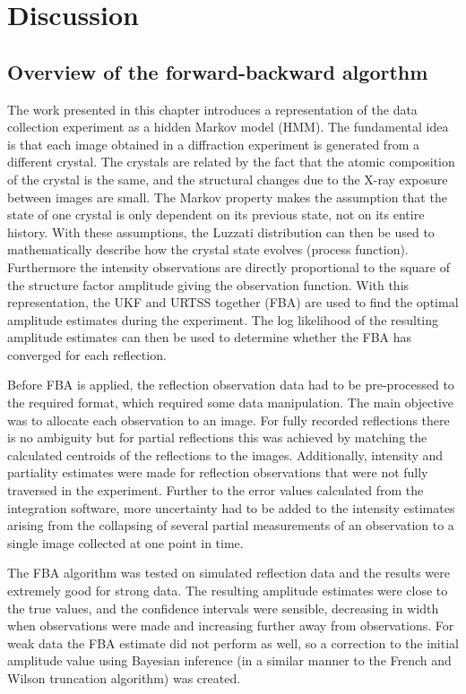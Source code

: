 \section{Discussion}
\label{sec:Discussion - Data Reduction}

\subsection{Overview of the forward-backward algorthm}
\label{sub:Overview of the forward-backward algorthm}
The work presented in this chapter introduces a representation of the data collection experiment as a hidden Markov model (HMM).
The fundamental idea is that each image obtained in a diffraction experiment is generated from a different crystal.
The crystals are related by the fact that the atomic composition of the crystal is the same, and the structural changes due to the X-ray exposure between images are small.
The Markov property makes the assumption that the state of one crystal is only dependent on its previous state, not on its entire history.
With these assumptions, the Luzzati distribution \cite{luzzati1952traitement,read1990structure} can then be used to mathematically describe how the crystal state evolves (process function).
Furthermore the intensity observations are directly proportional to the square of the structure factor amplitude giving the observation function.
With this representation, the UKF and URTSS together (FBA) are used to find the optimal amplitude estimates during the experiment.
The log likelihood of the resulting amplitude estimates can then be used to determine whether the FBA has converged for each reflection.

Before FBA is applied, the reflection observation data had to be pre-processed to the required format, which required some data manipulation.
The main objective was to allocate each observation to an image.
For fully recorded reflections there is no ambiguity but for partial reflections this was achieved by matching the calculated centroids of the reflections to the images.
Additionally, intensity and partiality estimates were made for reflection observations that were not fully traversed in the experiment.
Further to the error values calculated from the integration software, more uncertainty had to be added to the intensity estimates arising from the collapsing of several partial measurements of an observation to a single image collected at one point in time.

The FBA algorithm was tested on simulated reflection data and the results were extremely good for strong data.
The resulting amplitude estimates were close to the true values, and the confidence intervals were sensible, decreasing in width when observations were made and increasing further away from observations.
For weak data the FBA estimate did not perform as well, so a correction to the initial amplitude value using Bayesian inference (in a similar manner to the French and Wilson truncation algorithm) was created.

